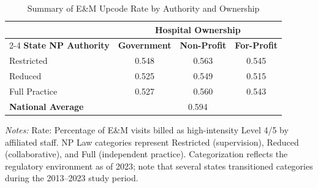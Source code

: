 \begin{table}[htbp]
    \centering
    \caption{Summary of E\&M Upcode Rate by Authority and Ownership}
    \label{tab:partb_em_upcode_rate}
    \vspace{0.2cm}
    \begin{tabular}{lccc}
        \toprule
        & \multicolumn{3}{c}{\textbf{Hospital Ownership}} \\
        \cmidrule(lr){2-4}
        \textbf{State NP Authority} & \textbf{Government} & \textbf{Non-Profit} & \textbf{For-Profit} \\
        \midrule
        Restricted & 0.548 & 0.563 & 0.545 \\
        Reduced & 0.525 & 0.549 & 0.515 \\
        Full Practice & 0.527 & 0.560 & 0.543 \\
        \midrule
        \textbf{National Average} & \multicolumn{3}{c}{0.594} \\
        \bottomrule
    \end{tabular}
    \vspace{0.1cm}
    \begin{minipage}{0.85\textwidth}
        \footnotesize \textit{Notes:} Rate: Percentage of E\&M visits billed as high-intensity Level 4/5 by affiliated staff. NP Law categories represent Restricted (supervision), Reduced (collaborative), and Full (independent practice). Categorization reflects the regulatory environment as of 2023; note that several states transitioned categories during the 2013--2023 study period.
    \end{minipage}
\end{table}